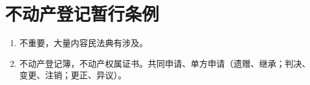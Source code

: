 \section{不动产登记暂行条例}
\begin{enumerate}
  \item 不重要，大量内容民法典有涉及。
  \item 不动产登记簿，不动产权属证书。共同申请、单方申请（遗赠、继承；判决、变更、注销；更正、异议）。
\end{enumerate}